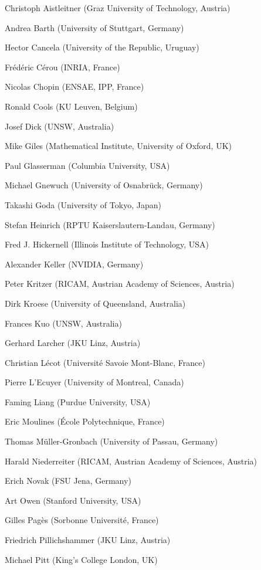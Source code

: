\setlength{\columnsep}{1cm}
\begin{multicols}{2}
\raggedright
Christoph Aistleitner (Graz University of Technology, Austria)

Andrea Barth (University of Stuttgart, Germany)

Hector Cancela (University of the Republic, Uruguay)

Frédéric Cérou (INRIA, France)

Nicolas Chopin (ENSAE, IPP, France)

Ronald Cools (KU Leuven, Belgium)

Josef Dick (UNSW, Australia)

Mike Giles (Mathematical Institute, University of Oxford, UK)

Paul Glasserman (Columbia University, USA)

Michael Gnewuch (University of Osnabrück, Germany)

Takashi Goda (University of Tokyo, Japan)

Stefan Heinrich (RPTU Kaiserslautern-Landau, Germany)

Fred J. Hickernell (Illinois Institute of Technology, USA)

Alexander Keller (NVIDIA, Germany)

Peter Kritzer (RICAM, Austrian Academy of Sciences, Austria)

Dirk Kroese (University of Queensland, Australia)

Frances Kuo (UNSW, Australia)

Gerhard Larcher (JKU Linz, Austria)

Christian Lécot (Université Savoie Mont-Blanc, France)

Pierre L'Ecuyer (University of Montreal, Canada)

Faming Liang (Purdue University, USA)

Eric Moulines (\'{E}cole Polytechnique, France)

Thomas Müller-Gronbach (University of Passau, Germany)

Harald Niederreiter (RICAM, Austrian Academy of Sciences, Austria)

Erich Novak (FSU Jena, Germany)

Art Owen (Stanford University, USA)

Gilles Pagès (Sorbonne Universit\'{e}, France)

Friedrich Pillichshammer (JKU Linz, Austria)

Michael Pitt (King's College London, UK)


\end{multicols}

